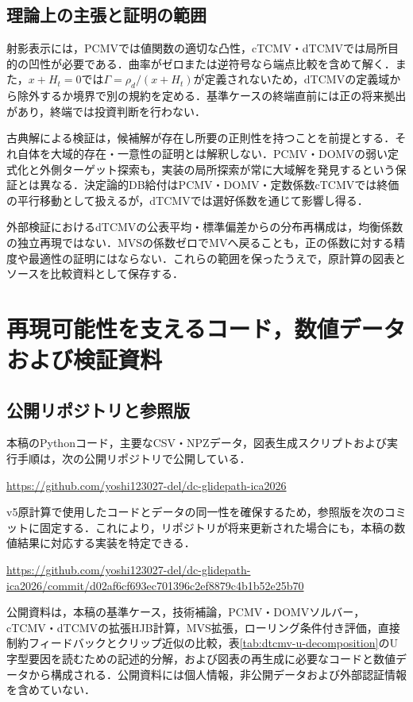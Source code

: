 \documentclass[10pt,a4paper]{article}
\theoremstyle{plain}
\theoremstyle{definition}
\begin{document}
\subsection{理論上の主張と証明の範囲}
射影表示には，PCMVでは値関数の適切な凸性，cTCMV・dTCMVでは局所目的の凹性が必要である．曲率がゼロまたは逆符号なら端点比較を含めて解く．また，$x+H_t=0$では$\Gamma=\rho_d/(x+H_t)$が定義されないため，dTCMVの定義域から除外するか境界で別の規約を定める．基準ケースの終端直前には正の将来拠出があり，終端では投資判断を行わない．

古典解による検証は，候補解が存在し所要の正則性を持つことを前提とする．それ自体を大域的存在・一意性の証明とは解釈しない．PCMV・DOMVの弱い定式化と外側ターゲット探索も，実装の局所探索が常に大域解を発見するという保証とは異なる．決定論的DB給付はPCMV・DOMV・定数係数cTCMVでは終価の平行移動として扱えるが，dTCMVでは選好係数を通じて影響し得る．

外部検証におけるdTCMVの公表平均・標準偏差からの分布再構成は，均衡係数の独立再現ではない．MVSの係数ゼロでMVへ戻ることも，正の係数に対する精度や最適性の証明にはならない．これらの範囲を保ったうえで，原計算の図表とソースを比較資料として保存する．

\section{再現可能性を支えるコード，数値データおよび検証資料}
\label{app:reproducibility}

\subsection{公開リポジトリと参照版}

本稿のPythonコード，主要なCSV・NPZデータ，図表生成スクリプトおよび実行手順は，次の公開リポジトリで公開している．
\begin{center}
\url{https://github.com/yoshi123027-del/dc-glidepath-ica2026}
\end{center}
v5原計算で使用したコードとデータの同一性を確保するため，参照版を次のコミットに固定する．これにより，リポジトリが将来更新された場合にも，本稿の数値結果に対応する実装を特定できる．
\begin{center}
\url{https://github.com/yoshi123027-del/dc-glidepath-ica2026/commit/d02af6cf693ec701396c2ef8879c4b1b52e25b70}
\end{center}
公開資料は，本稿の基準ケース，技術補論，PCMV・DOMVソルバー，cTCMV・dTCMVの拡張HJB計算，MVS拡張，ローリング条件付き評価，直接制約フィードバックとクリップ近似の比較，表\ref{tab:dtcmv-u-decomposition}のU字型要因を読むための記述的分解，および図表の再生成に必要なコードと数値データから構成される．公開資料には個人情報，非公開データおよび外部認証情報を含めていない．
\end{document}
